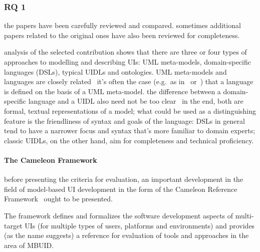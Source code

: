 \subsubsection{RQ 1}\label{subsubsec:rq-1}

the papers have been carefully reviewed and compared.
sometimes additional papers related to the original ones have also been reviewed for completeness.

analysis of the selected contribution shows that there are three or four types of approaches to modelling and describing UIs: UML meta-models, domain-specific languages (DSLs), typical UIDLs and ontologies.
UML meta-models and languages are closely related \textemdash\ it's often the case (e.g.\ as in~\cite{Karu2013-po} or~\cite{moldovan2020open}) that a language is defined on the basis of a UML meta-model.
the difference between a domain-specific language and a UIDL also need not be too clear \textemdash\ in the end, both are formal, textual representations of a model;
what could be used as a distinguishing feature is the friendliness of syntax and goals of the language: DSLs in general tend to have a narrower focus and syntax that's more familiar to domain experts;
classic UIDLs, on the other hand, aim for completeness and technical proficiency.

\paragraph{The Cameleon Framework}
before presenting the criteria for evaluation, an important development in the field of model-based UI development in the form of the Cameleon Reference Framework~\cite{calvary_cameleon_framework_2002} ought to be presented.

The framework defines and formalizes the software development aspects of multi-target UIs (for multiple types of users, platforms and environments) and provides (as the name suggests) a reference for evaluation of tools and approaches in the area of MBUID\@.

